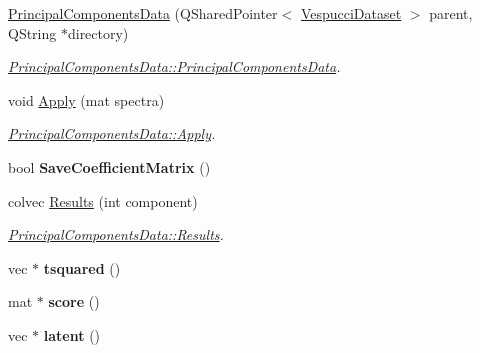 \begin{DoxyCompactItemize}
\item 
\hyperlink{class_principal_components_data_a288b9bc87055615bd7b3867ba7be1f48}{Principal\+Components\+Data} (Q\+Shared\+Pointer$<$ \hyperlink{class_vespucci_dataset}{Vespucci\+Dataset} $>$ parent, Q\+String $\ast$directory)
\begin{DoxyCompactList}\small\item\em \hyperlink{class_principal_components_data_a288b9bc87055615bd7b3867ba7be1f48}{Principal\+Components\+Data\+::\+Principal\+Components\+Data}. \end{DoxyCompactList}\item 
void \hyperlink{class_principal_components_data_abc8ccfa909ad98d53a06b066aeea38df}{Apply} (mat spectra)
\begin{DoxyCompactList}\small\item\em \hyperlink{class_principal_components_data_abc8ccfa909ad98d53a06b066aeea38df}{Principal\+Components\+Data\+::\+Apply}. \end{DoxyCompactList}\item 
\hypertarget{class_principal_components_data_ada4b8b37f6acc4c32772055d8ff37067}{bool {\bfseries Save\+Coefficient\+Matrix} ()}\label{class_principal_components_data_ada4b8b37f6acc4c32772055d8ff37067}

\item 
colvec \hyperlink{class_principal_components_data_aba30bcb89a6667bf8cd80e605337e9ba}{Results} (int component)
\begin{DoxyCompactList}\small\item\em \hyperlink{class_principal_components_data_aba30bcb89a6667bf8cd80e605337e9ba}{Principal\+Components\+Data\+::\+Results}. \end{DoxyCompactList}\item 
\hypertarget{class_principal_components_data_a995a0e7cf6ed2ec4131bbe50bcf4cef6}{vec $\ast$ {\bfseries tsquared} ()}\label{class_principal_components_data_a995a0e7cf6ed2ec4131bbe50bcf4cef6}

\item 
\hypertarget{class_principal_components_data_a809873d82bc42ef1101cf102891f4bc6}{mat $\ast$ {\bfseries score} ()}\label{class_principal_components_data_a809873d82bc42ef1101cf102891f4bc6}

\item 
\hypertarget{class_principal_components_data_a21e37c5b5ca0bd2d9ee5424afc0f116f}{vec $\ast$ {\bfseries latent} ()}\label{class_principal_components_data_a21e37c5b5ca0bd2d9ee5424afc0f116f}


\end{DoxyCompactItemize}
